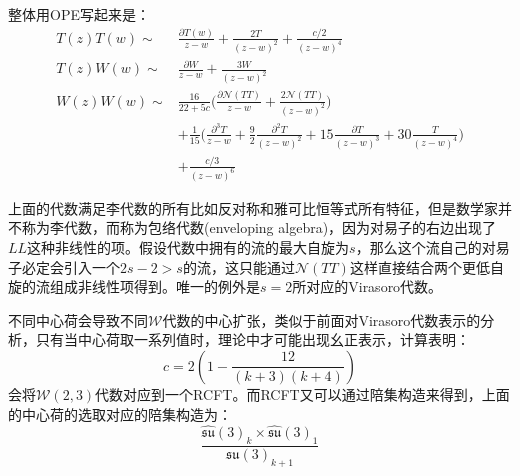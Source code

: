 整体用OPE写起来是：
\begin{equation}
	\begin{aligned}
		T(z)T(w) \sim&\frac{\partial T(w)}{z-w}+\frac{2T}{(z-w)^2}+\frac{c/2}{(z-w)^4} \\
		T(z)W(w) \sim&\frac{\partial W}{z-w}+\frac{3W}{(z-w)^2}  \\
		W(z)W(w) \sim&\frac{16}{22+5c}\Big(\frac{\partial\mathcal{N}(TT)}{z-w}+\frac{2\mathcal{N}(TT)}{(z-w)^2}\Big)  \\
		&+\frac{1}{15}\Big(\frac{\partial^3T}{z-w}+\frac{9}{2}\frac{\partial^2T}{(z-w)^2}+15\frac{\partial T}{(z-w)^3}+30\frac{T}{(z-w)^4}\Big) \\
		&+\frac{c/3}{(z-w)^6}
	\end{aligned}
\end{equation}

上面的代数满足李代数的所有比如反对称和雅可比恒等式所有特征，但是数学家并不称为李代数，而称为包络代数(enveloping algebra)，因为对易子的右边出现了$LL$这种非线性的项。假设代数中拥有的流的最大自旋为$s$，那么这个流自己的对易子必定会引入一个$2s-2>s$的流，这只能通过$\mathcal{N}(TT)$这样直接结合两个更低自旋的流组成非线性项得到。唯一的例外是$s=2$所对应的Virasoro代数。

不同中心荷会导致不同$\mathcal{W}$代数的中心扩张，类似于前面对Virasoro代数表示的分析，只有当中心荷取一系列值时，理论中才可能出现幺正表示，计算表明：
\begin{equation}
	c=2\left(1-\frac{12}{(k+3)(k+4)}\right)
\end{equation}
会将$\mathcal{W}(2,3)$代数对应到一个RCFT。而RCFT又可以通过陪集构造来得到，上面的中心荷的选取对应的陪集构造为：
\begin{equation}
	\frac{\widehat{\mathfrak{su}}(3)_k\times\widehat{\mathfrak{su}}(3)_1}{\mathfrak{su}(3)_{k+1}}
\end{equation}
